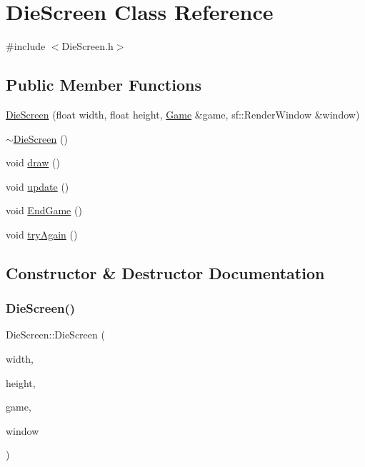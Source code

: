 \hypertarget{class_die_screen}{}\section{Die\+Screen Class Reference}
\label{class_die_screen}


{\ttfamily \#include $<$Die\+Screen.\+h$>$}

\subsection*{Public Member Functions}
\begin{DoxyCompactItemize}
\item 
\mbox{\hyperlink{class_die_screen_abf523fc4e157222e0cb66678e077ee58}{Die\+Screen}} (float width, float height, \mbox{\hyperlink{class_game}{Game}} \&game, sf\+::\+Render\+Window \&window)
\item 
\mbox{\hyperlink{class_die_screen_ac5ba7e92fc9155945dca091290661893}{$\sim$\+Die\+Screen}} ()
\item 
void \mbox{\hyperlink{class_die_screen_a94785b5d42d608798984c8c368c62296}{draw}} ()
\item 
void \mbox{\hyperlink{class_die_screen_ac7908cfa219b934848c36685fe5337a0}{update}} ()
\item 
void \mbox{\hyperlink{class_die_screen_a2d739b1993285caa83f7dc330380deb6}{End\+Game}} ()
\item 
void \mbox{\hyperlink{class_die_screen_a5693b4cc396d654b84722ea6de2f9d8f}{try\+Again}} ()
\end{DoxyCompactItemize}


\subsection{Constructor \& Destructor Documentation}
\mbox{\label{class_die_screen_abf523fc4e157222e0cb66678e077ee58}} 
\subsubsection{\texorpdfstring{DieScreen()}{DieScreen()}}
{\footnotesize\ttfamily Die\+Screen\+::\+Die\+Screen (\begin{DoxyParamCaption}\item[{float}]{width,  }\item[{float}]{height,  }\item[{\mbox{\hyperlink{class_game}{Game}} \&}]{game,  }\item[{sf\+::\+Render\+Window \&}]{window }\end{DoxyParamCaption})}

